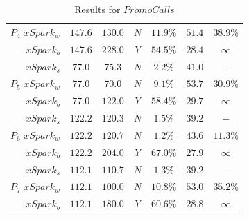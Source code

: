 \begin{table}[tbhp]
\begin{tabular}{r|c|c|c|c|c|c}
		$P_4 \,\,xSpark_w$  & $147.6$   & $130.0$   & $N$   & $11.9\%$   & $51.4$   & $38.9\%$  \\
		$xSpark_b$  & $147.6$   & $228.0$   & $Y$   & $54.5\%$   & $28.4$   & $\infty$  \\
		\midrule
		$xSpark_s$  & $77.0$   & $75.3$   & $N$   & $2.2\%$   & $41.0$   & $-$  \\
		$P_5 \,\,xSpark_w$  & $77.0$   & $70.0$   & $N$   & $9.1\%$   & $53.7$   & $30.9\%$  \\
		$xSpark_b$  & $77.0$   & $122.0$   & $Y$   & $58.4\%$   & $29.7$   & $\infty$  \\
		\midrule
		$xSpark_s$  & $122.2$   & $120.3$   & $N$   & $1.5\%$   & $39.2$   & $-$  \\
		$P_6 \,\,xSpark_w$  & $122.2$   & $120.7$   & $N$   & $1.2\%$   & $43.6$   & $11.3\%$  \\
		$xSpark_b$  & $122.2$   & $204.0$   & $Y$   & $67.0\%$   & $27.9$   & $\infty$  \\
		\midrule
		$xSpark_s$  & $112.1$   & $110.7$   & $N$   & $1.3\%$   & $39.2$   & $-$  \\
		$P_7 \,\,xSpark_w$  & $112.1$   & $100.0$   & $N$   & $10.8\%$   & $53.0$   & $35.2\%$  \\
		$xSpark_b$  & $112.1$   & $180.0$   & $Y$   & $60.6\%$   & $28.8$   & $\infty$  \\
		
		\bottomrule
	\end{tabular}
	\caption{Results for \boldmath$PromoCalls$}
	\label{Table:PerfPromo}
\end{table}


